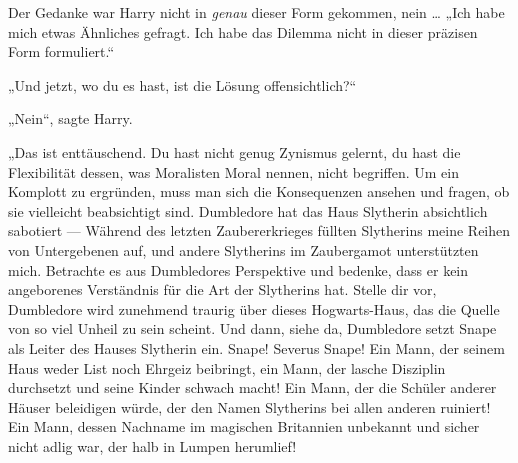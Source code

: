 Der Gedanke war Harry nicht in \emph{genau} dieser Form gekommen, nein …
„Ich habe mich etwas Ähnliches gefragt. Ich habe das Dilemma nicht in dieser präzisen Form formuliert.“

„Und jetzt, wo du es hast, ist die Lösung offensichtlich?“

„Nein“, sagte Harry.

„Das ist enttäuschend. Du hast nicht genug Zynismus gelernt, du hast die Flexibilität dessen, was Moralisten Moral nennen, nicht begriffen. Um ein Komplott zu ergründen, muss man sich die Konsequenzen ansehen und fragen, ob sie vielleicht beabsichtigt sind. Dumbledore hat das Haus Slytherin absichtlich sabotiert —  Während des letzten Zaubererkrieges füllten Slytherins meine Reihen von Untergebenen auf, und andere Slytherins im Zaubergamot unterstützten mich. Betrachte es aus Dumbledores Perspektive und bedenke, dass er kein angeborenes Verständnis für die Art der Slytherins hat. Stelle dir vor, Dumbledore wird zunehmend traurig über dieses Hogwarts-Haus, das die Quelle von so viel Unheil zu sein scheint.
Und dann, siehe da, Dumbledore setzt Snape als Leiter des Hauses Slytherin ein. Snape! Severus Snape! Ein Mann, der seinem Haus weder List noch Ehrgeiz beibringt, ein Mann, der lasche Disziplin durchsetzt und seine Kinder schwach macht! Ein Mann, der die Schüler anderer Häuser beleidigen würde, der den Namen Slytherins bei allen anderen ruiniert! Ein Mann, dessen Nachname im magischen Britannien unbekannt und sicher nicht adlig war, der halb in Lumpen herumlief!

